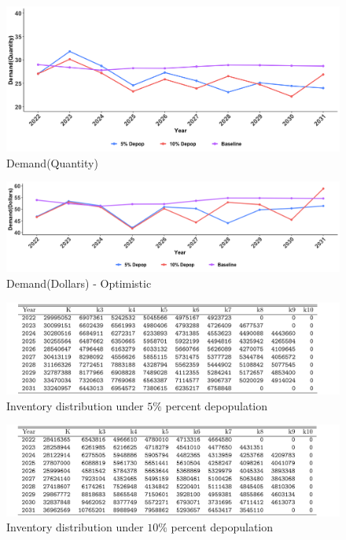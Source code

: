 \documentclass[
]{article}
\begin{document}
\begin{figure}
  \includegraphics[width=1.1\linewidth]{FMD-SimulationPlots/09-02/DemQuantityOPTDOM.png}
  \caption{Demand(Quantity)}
\end{figure}

\begin{figure}
  \includegraphics[width=1.1\linewidth]{FMD-SimulationPlots/09-02/DemandDollarsOPTDOM.png}
  \caption{Demand(Dollars) - Optimistic}
\end{figure}

\begin{figure}
  \includegraphics[width=8in]{FMD-SimulationPlots/09-02/OPT_INV_5.pdf}
  \caption{Inventory distribution under $5\%$ percent depopulation}
\end{figure}

\begin{figure}
  \includegraphics[width=8in]{FMD-SimulationPlots/09-02/OPT_INV_10.pdf}
  \caption{Inventory distribution under $10\%$ percent depopulation}
\end{figure}
\end{document}
